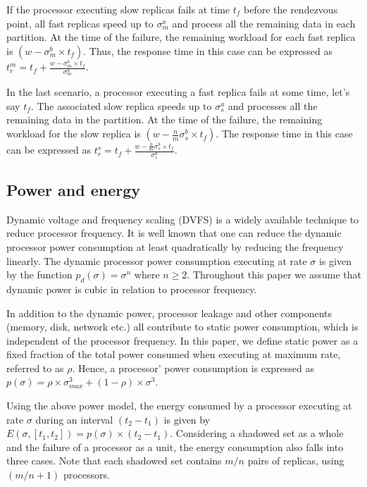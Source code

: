 If the processor executing slow replicas fails at time $t_f$ before the rendezvous point, all fast replicas speed up to $\sigma_m^a$ and process all the remaining data in each partition. At the time of the failure, the remaining workload for each fast replica is $(w-\sigma_m^b \times t_f)$. Thus, the response time in this case can be expressed as $t_r^m = t_f + \frac{w-\sigma_m^b \times t_f}{\sigma_m^a}$.

In the last scenario, a processor executing a fast replica fails at some time, let's say $t_f$. The associated slow replica speeds up to $\sigma_s^a$ and processes all the remaining data in the partition.  At the time of the failure, the remaining workload for the slow replica is $(w-\frac{n}{m}\sigma_s^b \times t_f)$. The response time in this case can be expressed as $t_r^s = t_f + \frac{w-\frac{n}{m}\sigma_s^b \times t_f}{\sigma_s^a}$.


\subsection{Power and energy}
\label{sec:power_model}
Dynamic voltage and frequency scaling
(DVFS) is a widely available technique to reduce processor frequency. It
is well known that one can reduce the dynamic processor power consumption at
least quadratically by reducing the frequency linearly. The
dynamic processor power consumption executing at rate
$\sigma$ is given by the function $p_d(\sigma)=\sigma^n$ where $n \ge
2$. Throughout this paper we assume that dynamic power is cubic
in relation to processor frequency.

In addition to the dynamic power, processor leakage and other components
(memory, disk, network etc.) all contribute to static power
consumption, which is independent of the processor frequency. In this paper, we
define static power as a fixed fraction of the total power consumed
when executing at maximum rate, referred to as $\rho$. Hence, a processor'
power consumption is expressed as
$p(\sigma)=\rho \times \sigma_{max}^3 + (1-\rho)\times \sigma^3$. 

Using the above power model, the
energy consumed by a processor executing at rate $\sigma$ during an
interval $(t_2-t_1)$ is given by 
$E(\sigma,[t_1, t_2]) = p(\sigma) \times (t_2-t_1)$. 
Considering a shadowed set as a whole and the failure of a processor as a unit, the energy consumption also falls into three cases. Note that each shadowed set contains $m/n$ pairs of replicas, using $(m/n + 1)$ processors. 

